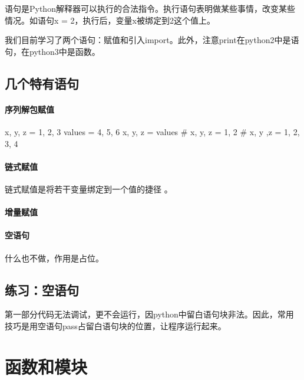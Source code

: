 语句是Python解释器可以执行的合法指令。执行语句表明做某些事情，改变某些情况。如语句x = 2，执行后，变量x被绑定到2这个值上。

我们目前学习了两个语句：赋值和引入import。此外，注意print在python2中是语句，在python3中是函数。
\subsection{几个特有语句}
\paragraph{序列解包赋值}
\begin{python}
  x, y, z = 1, 2, 3
  values = 4, 5, 6
  x, y, z = values
  # x, y, z = 1, 2
  # x, y ,z  = 1, 2, 3, 4
\end{python}
\paragraph{链式赋值}链式赋值是将若干变量绑定到一个值的捷径 。
\paragraph{增量赋值}
\paragraph{空语句}什么也不做，作用是占位。
\subsection{练习：空语句}
第一部分代码无法调试，更不会运行，因python中留白语句块非法。因此，常用技巧是用空语句pass占留白语句块的位置，让程序运行起来。

\section{函数和模块}
